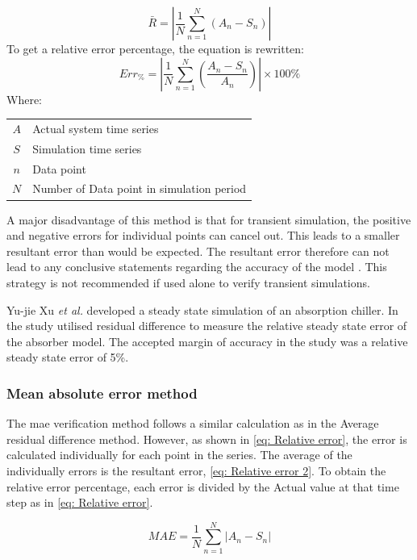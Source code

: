  			\begin{equation}
 			\label{eq: AMean absolute}
 			\bar{R} = \left| \dfrac{1}{N} \sum_{n=1}^{N}{ \left( A_{n} - S_{n}\right)}  \right|
 			\end{equation}
To get a relative error percentage, the equation is rewritten:	
 			\begin{equation}
 				\label{eq: Average difference}
 				Err_{\%} = \left| \dfrac{1}{N} \sum_{n=1}^{N}{ \left(\dfrac{ A_{n} - S_{n}}{A_n}\right)}  \right| \times 100 \%
 			\end{equation}
 			Where: \par 
 				\begin{table}[h!]
 					\centering
 					\begin{tabular}{cl}
 						$A$ & Actual system time series \\
 						$S$ & Simulation time series \\
 						$n$ & Data point \\
 						$N$ & Number of Data point in simulation period \\
 					\end{tabular} 
 				\end{table}	
 			A major disadvantage of this method is that for transient simulation, the positive and negative errors for individual points can cancel out. This leads to a smaller resultant error than would be expected. The resultant error therefore can not lead to any conclusive statements regarding the accuracy of the model \cite{sarin2010comparing}.  This strategy is not recommended if used alone to verify transient simulations. 
 			\par 
 						
 			Yu-jie Xu \textit{et al.} \cite{xu2016modeling} developed a steady state simulation of an absorption chiller. In the study \cite{xu2016modeling} utilised  residual difference to measure the relative steady state error of the absorber model. The accepted margin of accuracy in the study was a relative steady state error of 5\%. 
 			
 		\subsubsection{Mean absolute error method}
 		The \gls{mae} verification method follows a similar calculation as in the Average residual difference method. However, as shown in \cref{eq: Relative error}, the error is calculated individually for each point in the series. The average of the individually errors is the resultant error, \cref{eq: Relative error 2}. To obtain the relative error percentage, each error is divided by the Actual value at that time step as in \cref{eq: Relative error}.
 		\par
 		\begin{equation}
 		\label{eq: Relative error 2}
 		MAE = \dfrac{1}{N}\sum_{n=1}^{N}{\left|A_{n} - S_{n}\right| }
 		\end{equation}
 		
